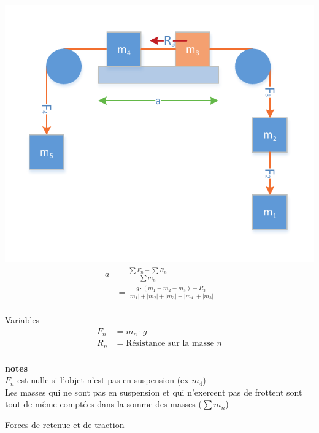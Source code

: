 \documentclass[12pt,a4paper]{article} %
\newcommand\framenote[1]{
	{\small {\bfseries notes} \\ #1}
}
\begin{document}
\begin{twocols}[0.5][0.5]
	\includegraphics[width=1\textwidth]{Newton-Poulies}
\nextcol
	\begin{align*}
		a &= \frac{\sum F_n - \sum R_n}{\sum m_n} \\
		  &= \frac{g\cdot(m_1+m_2-m_5) - R_3}{|m_1|+|m_2|+|m_3|+|m_4|+|m_5|} \\
	\end{align*}
	\par\vspace{0.2em}
	Variables \\
	\begin{align*}
		F_n &= m_n \cdot g \\
		R_n &= \text{Résistance sur la masse $n$} \\
	\end{align*}
	\par\vspace{0.2em}
	\framenote{
		$F_n$ est nulle si l'objet n'est pas en suspension (ex $m_4$) \\
		Les masses qui ne sont pas en suspension et qui n'exercent pas de frottent sont tout de même comptées dans la somme des masses ($\sum m_n$)
	}

\end{twocols}
Forces de retenue et de traction \\
\end{document}
